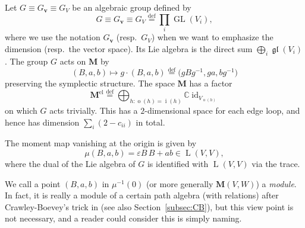 \documentclass[10pt,a4paper]{amsart}
\theoremstyle{definition}
\numberwithin{equation}{section}
\newcommand{\subsecref}[1]{Section~\ref{#1}}
\newcommand{\defeq}{\overset{\operatorname{\scriptstyle def}}{=}}
\newcommand{\C}{{\mathbb C}}
\newcommand{\GL}{\operatorname{GL}}
\newcommand{\gl}{\operatorname{\mathfrak{gl}}}
\newcommand{\id}{\operatorname{id}}
\newcommand{\vin}[1]{\operatorname{i}(#1)} %
\newcommand{\vout}[1]{\operatorname{o}(#1)} %
\newcommand{\bM}{{\mathbf M}} %
\newcommand{\bv}{{\mathbf v}} %
\newcommand{\HomL}{\operatorname{L}}
\begin{document}
Let $G \equiv G_\bv \equiv G_V$ be an algebraic group def\/ined by
\begin{equation*}
   G \equiv G_\bv \equiv G_V \defeq \prod_i \GL(V_i),
\end{equation*}
where we use the notation $G_\bv$ (resp.\ $G_V$) when we want to
emphasize the dimension (resp.\ the vector space). Its Lie algebra is
the direct sum $\bigoplus_i \gl(V_i)$.
%
The group $G$ acts on $\bM$ by
\begin{equation*}\label{eq:Kaction}
  (B,a,b) \mapsto g\cdot (B,a,b)
  \defeq \big(g B g^{-1}, ga, bg^{-1}\big)
\end{equation*}
preserving the symplectic structure. The space $\bM$ has a factor
\begin{equation}\label{eq:trivial}
   \bM^{\text{el}}\defeq
   \bigoplus_{h : \vout{h} = \vin{h}} \C \id_{V_{\vout{h}}}
\end{equation}
on which $G$ acts trivially. This has a $2$-dimensional space for each
edge loop, and hence has dimension $\sum_i (2 - c_{ii})$ in total.

The moment map vanishing at the origin is given by
\begin{equation}
  \mu(B, a, b) = \varepsilon B\, B + ab \in \HomL(V, V),
\end{equation}
where the dual of the Lie algebra of $G$ is identif\/ied with
$\HomL(V, V)$ via the trace.

We call a point $(B,a,b)$ in $\mu^{-1}(0)$ (or more generally
$\bM(V,W)$) a {\it module}. In fact, it is really a module of a
certain path algebra (with relations) after Crawley-Boevey's trick in
\cite[{the end of Introduction}]{CB} (see also \subsecref{subsec:CB}),
but this view point is not necessary, and a reader could consider this
is simply naming.
\end{document}
